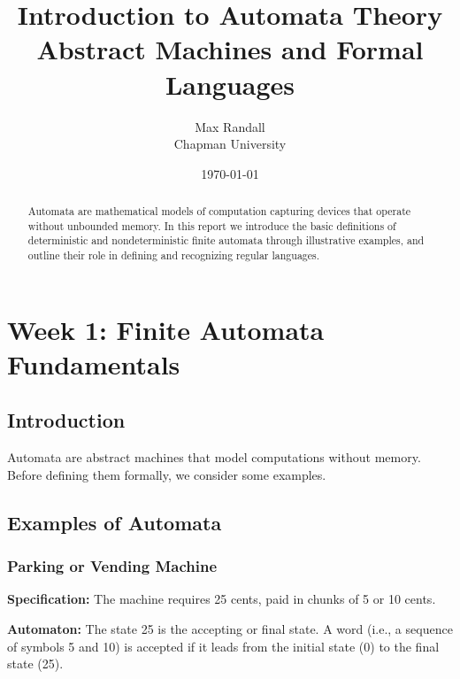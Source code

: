 \documentclass{article}
\title{Introduction to Automata Theory\\%
       \large Abstract Machines and Formal Languages}
\author{Max Randall \\ Chapman University}
\date{\today}
\theoremstyle{theorem}
\theoremstyle{definition}
\theoremstyle{remark}
\begin{document}
\maketitle

\begin{abstract}
Automata are mathematical models of computation capturing devices
that operate without unbounded memory.  In this report we introduce
the basic definitions of deterministic and nondeterministic finite
automata through illustrative examples, and outline their role in
defining and recognizing regular languages.
\end{abstract}


\tableofcontents

\newpage

\section{Week 1: Finite Automata Fundamentals}

\subsection{Introduction}
Automata are abstract machines that model computations without memory. Before defining them formally, we consider some examples.

\subsection{Examples of Automata}

\subsubsection{Parking or Vending Machine}
\textbf{Specification:} The machine requires 25 cents, paid in chunks of 5 or 10 cents.

\textbf{Automaton:} The state 25 is the accepting or final state. A word (i.e., a sequence of symbols 5 and 10) is accepted if it leads from the initial state (0) to the final state (25).

\begin{center}
\end{center}
\end{document}
